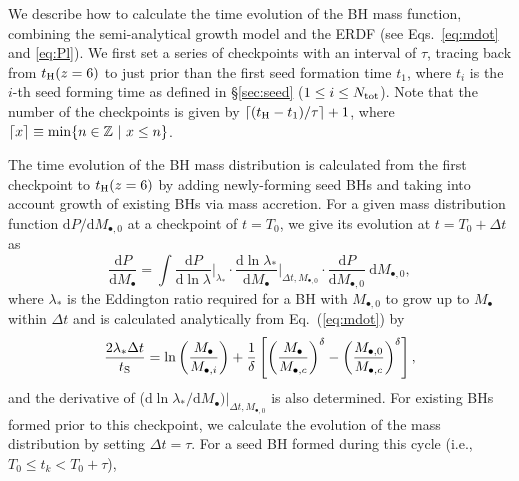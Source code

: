 \documentclass[twocolumn, twocolappendix]{aastex63}
\newcommand{\Mbh}{M_\bullet}
\newcommand{\tlife}{\tau}
\newcommand{\Nt}{N_\mathrm{t}}
\newcommand{\D}{\mathrm{d}}
\begin{document}
\begin{CJK*}{UTF8}{gbsn}
We describe how to calculate the time evolution of the BH mass function, 
combining the semi-analytical growth model and the ERDF (see Eqs.~\ref{eq:mdot} and \ref{eq:Pl}).
We first set a series of checkpoints with an interval of $\tlife$, 
tracing back from $t_{\rm H}(z=6)$ to just prior than the first seed formation time $t_1$, where $t_i$ is the $i$-th seed forming time
as defined in \S\ref{sec:seed} ($1\leq i\leq N_{\rm tot}$).
Note that the number of the checkpoints is given by $\lceil (t_{\rm H}-t_1)/\tau \rceil+1$, where $\lceil x\rceil \equiv {\rm min}\{n \in \mathbb{Z}~ |~x\leq n\}$.

The time evolution of the BH mass distribution is calculated from the first checkpoint to $t_{\rm H}(z=6)$ by adding newly-forming seed BHs
and taking into account growth of existing BHs via mass accretion.
For a given mass distribution function $\D P/\D  M_{\bullet, 0}$ at a checkpoint of $t=T_0$, 
we give its evolution at $t=T_0+\Delta t$ as
\begin{equation}
  \label{eq:dpdm}
  \frac{\D P}{\D \Mbh} = \int
   \frac{\D P}{\D \ln \lambda}\Big|_{\lambda_\ast} \cdot
   \frac{\D \ln \lambda_\ast}{\D  \Mbh}\Big|_{\Delta t, M_{\bullet,0}} \cdot
  \frac{\D P}{\D M_{\bullet, 0}}~\D M_{\bullet, 0},
\end{equation}
%
where $\lambda_\ast$ is the Eddington ratio required for a BH with $M_{\bullet,0}$ to grow up to $\Mbh$ within $\Delta t$
and is calculated analytically from Eq.~(\ref{eq:mdot}) by
\begin{equation}
  \label{eq:mi2m}
\frac{2 \lambda_\ast \Delta t}{t_{\rm S}}=
  \ln \left(\frac{\Mbh} {M_{\bullet,i}}\right) + \frac{1}{\delta} 
  \left[ \left(\frac{\Mbh}{M_{\bullet,c}}\right)^\delta - \left(\frac{M_{\bullet, 0}}{M_{\bullet,c}}\right)^\delta \right],
\end{equation}
%
and the derivative of ($\D \ln \lambda_\ast / \D  \Mbh )|_{\Delta t, M_{\bullet,0}}$ is also determined.
For existing BHs formed prior to this checkpoint, we calculate the evolution of the mass distribution by setting $\Delta t = \tlife$.
For a seed BH formed during this cycle (i.e., $T_0\leq t_k < T_0+\tlife$), 

\end{CJK*}
\end{document}
